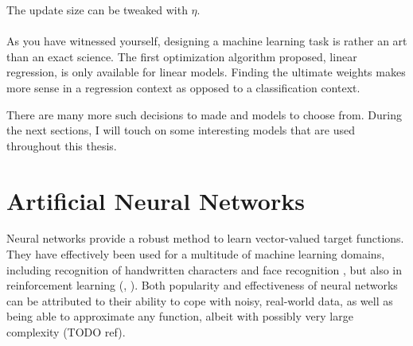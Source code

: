 The update size can be tweaked with $\eta$.

\paragraph{}
As you have witnessed yourself,
designing a machine learning task
is rather an art than an exact science.
The first optimization algorithm proposed,
linear regression,
is only available for linear models.
Finding the ultimate weights
makes more sense in a regression context
as opposed to a classification context.

There are many more such decisions to made
and models to choose from.
During the next sections,
I will touch on some interesting
models that are used throughout this thesis.


\section{Artificial Neural Networks}
Neural networks provide a robust method to learn
vector-valued target functions.
They have effectively been used for a multitude of machine learning domains,
including recognition of handwritten characters
\cite{LeCun1989}
and
face recognition
\cite{Cottreil1991},
but also in reinforcement learning
(\cite{anderson1989}, \cite{lin1993}). %
Both popularity and effectiveness of neural networks can be attributed to
their ability to cope with noisy, real-world data,
as well as being able to approximate any function,
albeit with possibly very large complexity (TODO ref).

